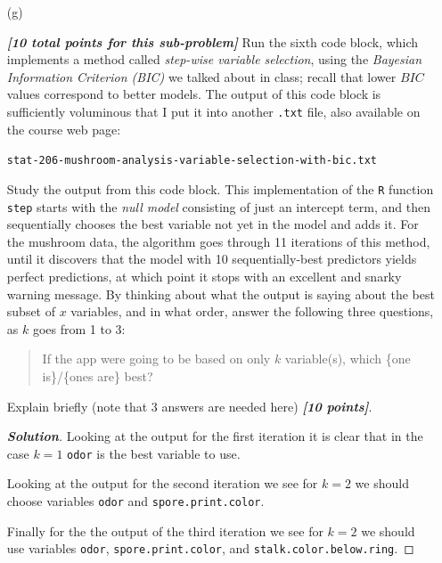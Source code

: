 \documentclass[12pt]{article}
\newenvironment{solution}{\begin{tcolorbox}[breakable]\begin{proof}[\textbf{\textit{Solution}}] }{\end{proof}\end{tcolorbox}}
\newcommand{\bi}[1]{\textbf{\textit{#1}}}
\begin{document}
\begin{itemize}

\item[(g)]

\bi{[10 total points for this sub-problem]} Run the sixth code block, which implements a method called \textit{step-wise variable selection}, using the \textit{Bayesian Information Criterion (BIC)} we talked about in class; recall that lower $BIC$ values correspond to better models. The output of this code block is sufficiently voluminous that I put it into another \texttt{.txt} file, also available on the course web page:

\hspace*{0.75in} \texttt{stat-206-mushroom-analysis-variable-selection-with-bic.txt}

Study the output from this code block. This implementation of the \texttt{R} function \texttt{step} starts with the \textit{null model} consisting of just an intercept term, and then sequentially chooses the best variable not yet in the model and adds it. For the mushroom data, the algorithm goes through 11 iterations of this method, until it discovers that the model with 10 sequentially-best predictors yields perfect predictions, at which point it stops with an excellent and snarky warning message. By thinking about what the output is saying about the best subset of $x$ variables, and in what order, answer the following three questions, as $k$ goes from 1 to 3: 

\begin{quote}

If the app were going to be based on only $k$ variable(s), which \{one is\}/\{ones are\} best?

\end{quote}

Explain briefly (note that 3 answers are needed here) \bi{[10 points]}. 

\begin{solution}
    Looking at the output for the first iteration it is clear that in the case $k = 1$ \texttt{odor} is the best variable to use. 

    Looking at the output for the second iteration we see for $k = 2$ we should choose variables \texttt{odor} and \texttt{spore.print.color}.

    Finally for the the output of the third iteration we see for $k = 2$ we should use variables \texttt{odor}, \texttt{spore.print.color}, and \texttt{stalk.color.below.ring}.
\end{solution}


\end{itemize}
\end{document}
